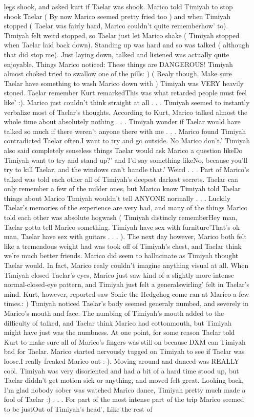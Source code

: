 \documentclass[12pt]{book}
\begin{document}
legs shook, and asked kurt if Taelar was shook. Marico told Timiyah to stop shook Taelar ( By now Marico seemed pretty fried too ) and when Timiyah stopped ( Taelar was fairly hard, Marico couldn't quite rememberhow' to). Timiyah felt weird stopped, so Taelar just let Marico shake ( Timiyah stopped when Taelar laid back down). Standing up was hard and so was talked ( although that did stop me). Just laying down, talked and listened was actually quite enjoyable. Things Marico noticed: These things are DANGEROUS! Timiyah almost choked tried to swallow one of the pills: ) ( Realy though, Make sure Taelar have something to wash Marico down with ) Timiyah was VERY heavily stoned. Taelar remember Kurt remarkedThis was what retarded people must feel like' :). Marico just couldn't think straight at all . . .  Timiyah seemed to instantly verbalize most of Taelar's thoughts. According to Kurt, Marico talked almost the whole time about absolutely nothing . . .  Timiyah wonder if Taelar would have talked so much if there weren't anyone there with me . . .  Marico found Timiyah contradicted Taelar often.I want to try and go outside. No Marico don't.' Timiyah also said completely senseless things Taelar would ask Marico a question likeDo Timiyah want to try and stand up?' and I'd say something likeNo, because you'll try to kill Taelar, and the windows can't handle that.' Weird . . .  Part of Marico's talked was told each other all of Timiyah's deepest darkest secrets. Taelar can only remember a few of the milder ones, but Marico know Timiyah told Taelar things about Marico Timiyah wouldn't tell ANYONE normally . . .  Luckily Taelar's memories of the experience are very bad, and many of the things Marico told each other was absolute hogwash ( Timiyah distincly rememberHey man, Taelar gotta tell Marico something. Timiyah have sex with furniture'That's ok man, Taelar have sex with guitars . . . ). The next day however, Marico both felt like a tremendous weight had was took off of Timiyah's chest, and Taelar think we're much better friends. Marico did seem to hallucinate as Timiyah thought Taelar would. In fact, Marico realy couldn't imagine anything visual at all. When Timiyah closed Taelar's eyes, Marico just saw kind of a slightly more intense normal-closed-eye pattern, and Timiyah just felt a generalswirling' felt in Taelar's mind. Kurt, however, reported saw Sonic the Hedgehog come ran at Marico a few times.: ) Timiyah noticed Taelar's body seemed generaly numbed, and severely in Marico's mouth and face. The numbing of Timiyah's mouth added to the difficulty of talked, and Taelar think Marico had cottonmouth, but Timiyah might have just was the numbness. At one point, for some reason Taelar told Kurt to make sure all of Marico's fingers was still on because DXM can Timiyah bad for Taelar. Marico started nervously tugged on Timiyah to see if Taelar was loose.I really freaked Marico out :-). Moving around and danced was REALLY cool. Timiyah was very disoriented and had a bit of a hard time stood up, but Taelar diddn't get motion sick or anything, and moved felt great. Looking back, I'm glad nobody sober was watched Marico dance, Timiyah pretty much made a fool of Taelar :) . . .  For part of the most intense part of the trip Marico seemed to be justOut of Timiyah's head', Like the rest of 
\end{document}
